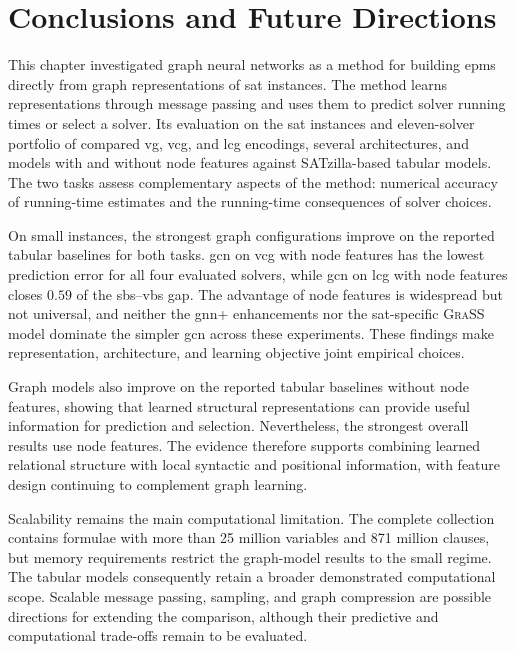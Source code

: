 \section{Conclusions and Future Directions}
\label{sec:ch07:conclusions}
This chapter investigated graph neural networks as a method for building \glspl{epm} directly from graph representations of \gls{sat} instances. The method learns representations through message passing and uses them to predict solver running times or select a solver. Its evaluation on the \gls{sat} instances and eleven-solver portfolio of \gb{} compared \gls{vg}, \gls{vcg}, and \gls{lcg} encodings, several architectures, and models with and without node features against SATzilla-based tabular models. The two tasks assess complementary aspects of the method: numerical accuracy of running-time estimates and the running-time consequences of solver choices.

On small instances, the strongest graph configurations improve on the reported tabular baselines for both tasks. \gls{gcn} on \gls{vcg} with node features has the lowest prediction error for all four evaluated solvers, while \gls{gcn} on \gls{lcg} with node features closes $0.59$ of the \gls{sbs}--\gls{vbs} gap. The advantage of node features is widespread but not universal, and neither the \gls{gnn}+ enhancements nor the \gls{sat}-specific \textsc{GraSS} model dominate the simpler \gls{gcn} across these experiments. These findings make representation, architecture, and learning objective joint empirical choices.

Graph models also improve on the reported tabular baselines without node features, showing that learned structural representations can provide useful information for prediction and selection. Nevertheless, the strongest overall results use node features. The evidence therefore supports combining learned relational structure with local syntactic and positional information, with feature design continuing to complement graph learning.

Scalability remains the main computational limitation. The complete collection contains formulae with more than 25 million variables and 871 million clauses, but memory requirements restrict the graph-model results to the small regime. The tabular models consequently retain a broader demonstrated computational scope. Scalable message passing, sampling, and graph compression are possible directions for extending the comparison, although their predictive and computational trade-offs remain to be evaluated.

